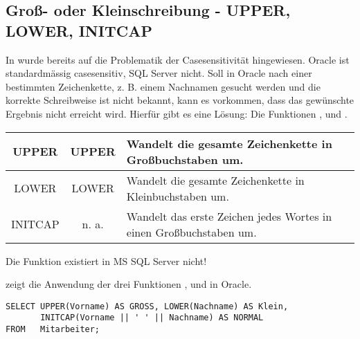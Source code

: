       \subsection{Groß- oder Kleinschreibung - UPPER, LOWER, INITCAP}
        In  wurde bereits auf die Problematik der Casesensitivität hingewiesen. Oracle ist standardmässig casesensitiv, SQL Server nicht. Soll in Oracle nach einer bestimmten Zeichenkette, z. B. einem Nachnamen gesucht werden und die korrekte Schreibweise ist nicht bekannt, kann es vorkommen, dass das gewünschte Ergebnis nicht erreicht wird. Hierfür gibt es eine Lösung: Die Funktionen ,  und .
        \begin{center}
          \label{srfstringfct1}
          \begin{small}
            \tabletail{
              \hline
            }
            \tablelasttail {
              \hline
            }
            \begin{supertabular}{|c|c|p{11cm}|}
              UPPER & UPPER& Wandelt die gesamte Zeichenkette in Großbuchstaben um.\\
              \hline
              LOWER & LOWER & Wandelt die gesamte Zeichenkette in Kleinbuchstaben um.\\
              \hline
              INITCAP & n. a.& Wandelt das erste Zeichen jedes Wortes in einen Großbuchstaben um.\\
            \end{supertabular}
          \end{small}
        \end{center}
        \begin{merke}
          Die Funktion  existiert in MS SQL Server nicht!
        \end{merke}
         zeigt die Anwendung der drei Funktionen ,  und  in Oracle.
        \begin{lstlisting}[language=oracle_sql,caption={UPPER, LOWER und INITCAP},label=sql03_01]
SELECT UPPER(Vorname) AS GROSS, LOWER(Nachname) AS Klein,
       INITCAP(Vorname || ' ' || Nachname) AS NORMAL
FROM   Mitarbeiter;
        \end{lstlisting}
